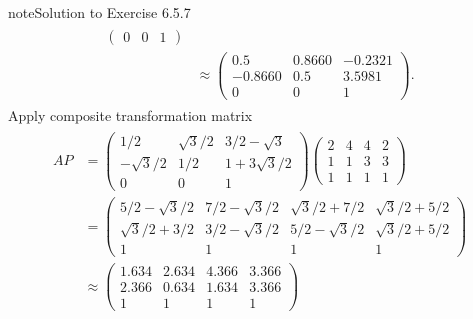 \documentclass[letterpaper,10pt,english]{jupyterBook}
\begin{document}
\begin{sphinxadmonition}{note}{Solution to Exercise 6.5.7}
\begin{equation*}
\begin{split}
\begin{align*}
\begin{pmatrix}
        0 & 0 & 1 
    \end{pmatrix} \\
    &\approx
    \begin{pmatrix}
        0.5 & 0.8660 & -0.2321 \\
        -0.8660 & 0.5 & 3.5981 \\
        0 & 0 & 1
    \end{pmatrix}.
\end{align*} \end{split}
\end{equation*}
\sphinxAtStartPar
Apply composite transformation matrix
\begin{equation*}
\begin{split} \begin{align*}
    AP &= \begin{pmatrix}
        1/2 & \sqrt{3}/2 & 3/2 - \sqrt{3} \\
        -\sqrt{3}/2 & 1/2 & 1 + 3\sqrt{3}/2 \\
        0 & 0 & 1 
    \end{pmatrix}
    \begin{pmatrix} 
        2 & 4 & 4 & 2 \\
        1 & 1 & 3 & 3 \\
        1 & 1 & 1 & 1 
    \end{pmatrix} \\
    &= \begin{pmatrix}
        5/2 - \sqrt{3}/2 & 7/2 - \sqrt{3}/2 & \sqrt{3}/2 + 7/2 & \sqrt{3}/2 + 5/2 \\
        \sqrt{3}/2 + 3/2 & 3/2 - \sqrt{3}/2 & 5/2 - \sqrt{3}/2 & \sqrt{3}/2 + 5/2 \\
        1 & 1 & 1 & 1
    \end{pmatrix} \\
    &\approx \begin{pmatrix}
        1.634 & 2.634 & 4.366 & 3.366 \\
        2.366 & 0.634 & 1.634 & 3.366 \\
        1 & 1 & 1 & 1 
    \end{pmatrix}
\end{align*} \end{split}
\end{equation*}
\begin{figure}[htbp]
\centering

\noindent{}
\end{figure}
\end{sphinxadmonition}
\end{document}
